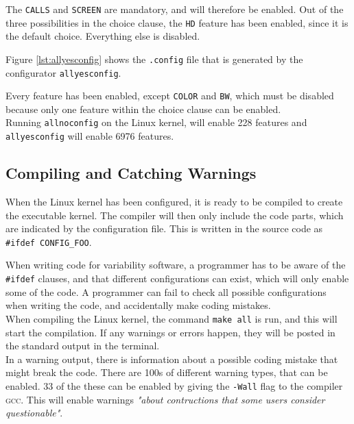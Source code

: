 \documentclass[a4paper,11pt]{report}
\newcommand{\textcode}[1]{\fboxsep=1pt\texttt{\colorbox{gray!20}{#1}}}
\newcommand{\figa}{
    \begin{figure}[!htpb]
    \centering
}
\newcommand{\figb}[2]{
    \caption{#1}
    \label{#2}
    \end{figure}
}
\begin{document}
The \texttt{CALLS} and \texttt{SCREEN} are mandatory, and will 
therefore be enabled. Out of the three possibilities in the choice clause, the 
\texttt{HD} feature has been enabled, since it is the default choice. Everything
else is disabled.


\figa
    \subfigure[allnoconfig]{
        \label{lst:allnoconfig}
        
    }
    \qquad %
    \subfigure[allyesconfig]{
        \label{lst:allyesconfig}
        
    }
\figb{}{}


Figure \ref{lst:allyesconfig} shows the \texttt{.config} file that is generated by 
the configurator \texttt{allyesconfig}.

Every feature has been enabled, except \texttt{COLOR} and \texttt{BW}, which 
must be disabled because only one feature within the choice clause can be enabled.
\\

Running \texttt{allnoconfig} on the Linux kernel, will enable 228 features and 
\texttt{allyesconfig} will enable 6976 features.


            \subsection{Compiling and Catching Warnings}

When the Linux kernel has been configured, it is ready to be compiled to create 
the executable kernel. The compiler will then only include the code parts, 
which are indicated by the configuration file. This is written in the source 
code as \textcode{\#ifdef CONFIG\_FOO}.

When writing code for variability software, a programmer has to be aware of the 
\textcode{\#ifdef} clauses, and that different configurations can exist, which 
will only enable some of the code. A programmer can fail to check all possible 
configurations when writing the code, and accidentally make coding mistakes.
\\

When compiling the Linux kernel, the command \textcode{make all} is run, and 
this will start the compilation. If any warnings or errors happen, they will be 
posted in the standard output in the terminal.
\\

In a warning output, there is information about a possible coding mistake that 
might break the code. There are 100s of different warning types, that can be 
enabled. 33 of the these can be enabled by giving the \textcode{-Wall} flag 
to the compiler \textsc{gcc}\cite{gccwarnings}. This will enable warnings 
\emph{"about contructions that some users consider 
questionable"}\cite{gccwarnings}.
\end{document}
